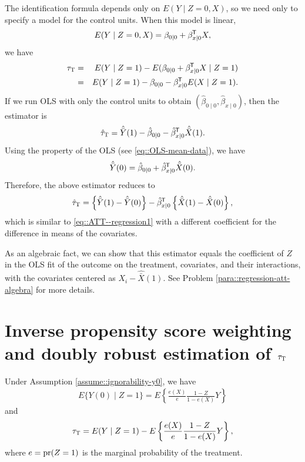 \begin{example}\label{eg::att-regression2}
The identification formula depends only on $E(Y\mid Z=0, X)$, so we need only to specify a model for the control units. When this model is linear, 
$$
E(Y\mid Z=0, X) =\beta_{0\mid 0}   + \beta_{x\mid 0} ^{\mkern-1.5mu\mathsf{T}} X,
$$
we have 
\begin{eqnarray*}
\tau_\textsc{T} &=& E(Y\mid Z=1) - E(   \beta_{0\mid 0}   + \beta_{x\mid 0} ^{\mkern-1.5mu\mathsf{T}} X  \mid Z=1 ) \\
&=& E(Y\mid Z=1) -   \beta_{0\mid 0}    -  \beta_{x\mid 0}   ^{\mkern-1.5mu\mathsf{T}} E(X\mid Z=1). 
\end{eqnarray*}
If we run OLS with only the control units to obtain $( \hat{\beta}_{0\mid 0} ,  \hat{\beta}_{x\mid 0})$, then the estimator is
$$
\hat{\tau}_\textsc{T} = \hat{\bar{Y}}(1) -\hat{\beta}_{0\mid 0}  - \hat{\beta}_{x\mid 0}  ^{\mkern-1.5mu\mathsf{T}} \hat{\bar{X}}(1).
$$
Using the property of the OLS (see \ref{eq::OLS-mean-data}), we have 
$$
\hat{\bar{Y}}(0) = \hat{\beta}_{0\mid 0} + \hat{\beta}_{x\mid 0}  ^{\mkern-1.5mu\mathsf{T}} \hat{\bar{X}}(0).
$$ 
Therefore, the above estimator reduces to
$$
\hat{\tau}_\textsc{T} = \left\{  \hat{\bar{Y}}(1) - \hat{\bar{Y}}(0) \right\} - \hat{\beta}_{x\mid 0}  ^{\mkern-1.5mu\mathsf{T}} \left\{  \hat{\bar{X}}(1) -  \hat{\bar{X}}(0) \right\}, 
$$
which is similar to \eqref{eq::ATT--regression1} with a different coefficient for the difference in means of the covariates. 

As an algebraic fact, we can show that this estimator equals the coefficient of $Z$ in the OLS fit of the outcome on the treatment, covariates, and their interactions, with the covariates centered as $ X_i  - \hat{\bar{X}}(1)$. See Problem \ref{para::regression-att-algebra} for more details.  
\end{example}




\section{Inverse propensity score weighting and doubly robust estimation of $\tau_\textsc{T} $}


\begin{theorem}
\label{thm::ipw-att}
Under Assumption \ref{assume::ignorability-y0}, we have
\begin{eqnarray}
E\{ Y(0) \mid Z=1 \} = E\left\{         \frac{e(X)}{e}  \frac{1-Z}{1-e(X)} Y \right\}
\label{eq::ipw-att}
\end{eqnarray}
and
\begin{eqnarray}\label{eq::att-ipw-formula}
\tau_\textsc{T} = E(Y\mid Z=1) -  E\left\{         \frac{e(X)}{e}  \frac{1-Z}{1-e(X)} Y \right\} ,
\end{eqnarray}
where $e = \textup{pr}(Z=1)$ is the marginal probability of the treatment. 
\end{theorem}


